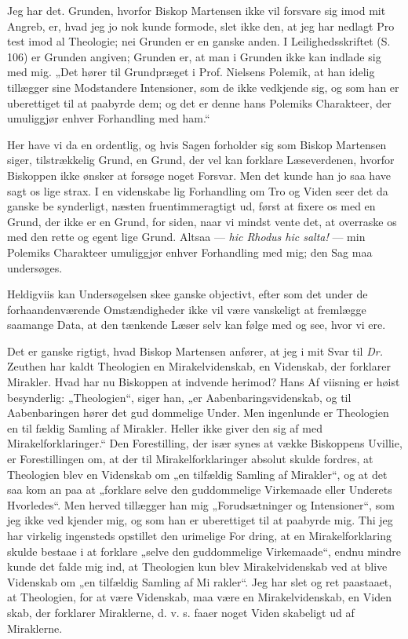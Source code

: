 \documentclass[12pt]{book}
\newcommand{\opage}[1]{\marginnote{\footnotesize\textit{[#1]}}}
\begin{document}
Jeg har det. Grunden, hvorfor Biskop Martensen
ikke vil forsvare sig imod mit Angreb, er, hvad jeg jo
\opage{81}\setcounter{footnote}{0}%
nok kunde formode, slet ikke den, at jeg har nedlagt Pro\-%
test imod al Theologie; nei Grunden er en ganske anden.
I Leilighedsskriftet (S. 106) er Grunden angiven; Grunden
er, at man i Grunden ikke kan indlade sig med mig. „Det
hører til Grundpræget i Prof. Nielsens Polemik, at han
idelig tillægger sine Modstandere Intensioner, som de ikke
vedkjende sig, og som han er uberettiget til at paabyrde dem;
og det er denne hans Polemiks Charakteer, der umuliggjør
enhver Forhandling med ham.“

Her have vi da en ordentlig, og hvis Sagen forholder
sig som Biskop Martensen siger, tilstrækkelig Grund, en
Grund, der vel kan forklare Læseverdenen, hvorfor Biskoppen
ikke ønsker at forsøge noget Forsvar. Men det kunde
han jo saa have sagt os lige strax. I en videnskabe\-%
lig Forhandling om Tro og Viden seer det da ganske be\-%
synderligt, næsten fruentimmeragtigt ud, først at fixere os
med en Grund, der ikke er en Grund, for siden, naar
vi mindst vente det, at overraske os med den rette og egent\-%
lige Grund. Altsaa --- \textit{hic Rhodus hic salta!} --- min
Polemiks Charakteer umuliggjør enhver Forhandling med mig;
den Sag maa undersøges.

Heldigviis kan Undersøgelsen skee ganske objectivt, efter\-%
som det under de forhaandenværende Omstændigheder ikke vil
være vanskeligt at fremlægge saamange Data, at den tænkende
Læser selv kan følge med og see, hvor vi ere.

Det er ganske rigtigt, hvad Biskop Martensen anfører,
at jeg i mit Svar til \textit{Dr.} Zeuthen har kaldt Theologien
en Mirakelvidenskab, en Videnskab, der forklarer Mirakler.
Hvad har nu Biskoppen at indvende herimod? Hans Af\-%
viisning er høist besynderlig: „Theologien“, siger han, „er
Aabenbaringsvidenskab, og til Aabenbaringen hører det gud\-%
dommelige Under. Men ingenlunde er Theologien en til\-%
fældig Samling af Mirakler. Heller ikke giver den sig af
med Mirakelforklaringer.“ Den Forestilling, der især synes
\opage{82}\setcounter{footnote}{0}%
at vække Biskoppens Uvillie, er Forestillingen om, at der til
Mirakelforklaringer absolut skulde fordres, at Theologien blev
en Videnskab om „en tilfældig Samling af Mirakler“, og at
det saa kom an paa at „forklare selve den guddommelige
Virkemaade eller Underets Hvorledes“. Men herved tillægger
han mig „Forudsætninger og Intensioner“, som jeg ikke ved\-%
kjender mig, og som han er uberettiget til at paabyrde mig.
Thi jeg har virkelig ingensteds opstillet den urimelige For\-%
dring, at en Mirakelforklaring skulde bestaae i at forklare
„selve den guddommelige Virkemaade“, endnu mindre kunde
det falde mig ind, at Theologien kun blev Mirakelvidenskab
ved at blive Videnskab om „en tilfældig Samling af Mi\-%
rakler“. Jeg har slet og ret paastaaet, at Theologien, for
at være Videnskab, maa være en Mirakelvidenskab, en Viden\-%
skab, der forklarer Miraklerne, d. v. s. faaer noget Viden\-%
skabeligt ud af Miraklerne.
\end{document}
